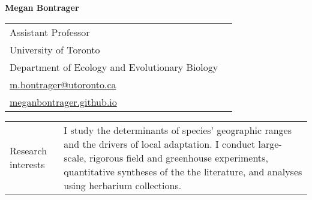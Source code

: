 \documentclass[letterpaper,11pt,oneside]{article}
\begin{document}
\thispagestyle{empty}

\noindent  \LARGE{\textbf{Megan Bontrager}} 
\smallskip
\normalsize

\noindent \begin{tabular}{@{} p{10cm} >{\raggedleft\arraybackslash}p{8.11cm}}
Assistant Professor \\
University of Toronto & \\
Department of Ecology and Evolutionary Biology & \\
{\href{mailto:m.bontrager@utoronto.ca}{m.bontrager@utoronto.ca}} & \\
{\href{https://meganbontrager.github.io}{meganbontrager.github.io}} & \\

\end{tabular}
\vspace{1em}

\noindent\hrulefill 

\bigskip
\bigskip




\noindent \begin{tabular}{@{} p{3cm} >{\raggedright}p{14.2cm}}
\Large{Research interests} & I study the determinants of species' geographic ranges and the drivers of local adaptation. I conduct large-scale, rigorous field and greenhouse experiments, quantitative syntheses of the the literature, and analyses using herbarium collections. \\
\end{tabular}
\bigskip



\end{document}
